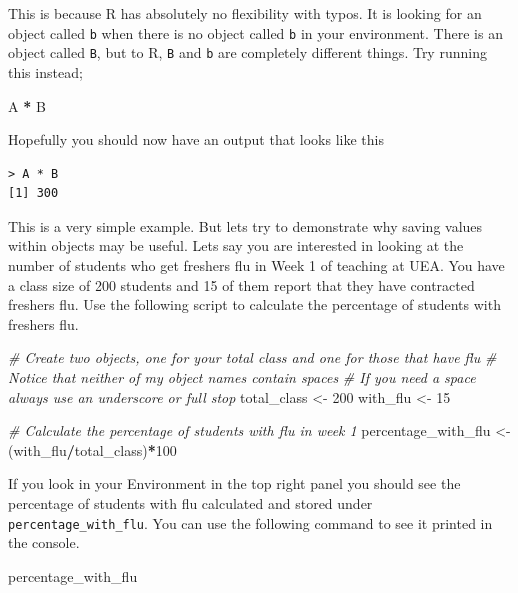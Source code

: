 \documentclass[
]{book}
\newenvironment{Shaded}{\begin{snugshade}}{\end{snugshade}}
\newcommand{\CommentTok}[1]{\textcolor[rgb]{0.56,0.35,0.01}{\textit{#1}}}
\newcommand{\DecValTok}[1]{\textcolor[rgb]{0.00,0.00,0.81}{#1}}
\newcommand{\NormalTok}[1]{#1}
\newcommand{\OtherTok}[1]{\textcolor[rgb]{0.56,0.35,0.01}{#1}}
\newcommand{\SpecialCharTok}[1]{\textcolor[rgb]{0.81,0.36,0.00}{\textbf{#1}}}
\begin{document}
This is because R has absolutely no flexibility with typos. It is looking for an object called \texttt{b} when there is no object called \texttt{b} in your environment. There is an object called \texttt{B}, but to R, \texttt{B} and \texttt{b} are completely different things. Try running this instead;

\begin{Shaded}
\begin{Highlighting}[]
\NormalTok{A }\SpecialCharTok{*}\NormalTok{ B}
\end{Highlighting}
\end{Shaded}

Hopefully you should now have an output that looks like this

\begin{verbatim}
> A * B
[1] 300
\end{verbatim}

This is a very simple example. But lets try to demonstrate why saving values within objects may be useful. Lets say you are interested in looking at the number of students who get freshers flu in Week 1 of teaching at UEA. You have a class size of 200 students and 15 of them report that they have contracted freshers flu. Use the following script to calculate the percentage of students with freshers flu.

\begin{Shaded}
\begin{Highlighting}[]
\CommentTok{\# Create two objects, one for your total class and one for those that have flu}
\CommentTok{\# Notice that neither of my object names contain spaces}
\CommentTok{\# If you need a space always use an underscore or full stop}
\NormalTok{total\_class }\OtherTok{\textless{}{-}} \DecValTok{200}
\NormalTok{with\_flu }\OtherTok{\textless{}{-}} \DecValTok{15}

\CommentTok{\# Calculate the percentage of students with flu in week 1}
\NormalTok{percentage\_with\_flu }\OtherTok{\textless{}{-}}\NormalTok{ (with\_flu}\SpecialCharTok{/}\NormalTok{total\_class)}\SpecialCharTok{*}\DecValTok{100}
\end{Highlighting}
\end{Shaded}

If you look in your Environment in the top right panel you should see the percentage of students with flu calculated and stored under \texttt{percentage\_with\_flu}. You can use the following command to see it printed in the console.

\begin{Shaded}
\begin{Highlighting}[]
\NormalTok{percentage\_with\_flu}
\end{Highlighting}
\end{Shaded}
\end{document}

